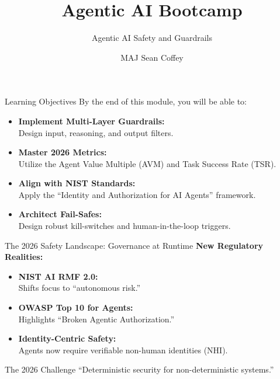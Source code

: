 \documentclass{beamer}       %
\title[]{Agentic AI Bootcamp}
\subtitle[] %
{Agentic AI Safety and Guardrails}
\author[] %
{MAJ Sean Coffey} %
\institute
{Army Cyber Institute, U.S. Military Academy}
\date{\monthyeardate}
\begin{document}
{\DivisionLogo
\begin{frame}
    \titlepage
\end{frame}
}


\begin{frame}{Learning Objectives}
    \small
    By the end of this module, you will be able to:
    \begin{itemize}
        \item \textbf{Implement Multi-Layer Guardrails:}\\
              Design input, reasoning, and output filters.
        \item \textbf{Master 2026 Metrics:}\\
              Utilize the Agent Value Multiple (AVM) and Task Success Rate (TSR).
        \item \textbf{Align with NIST Standards:}\\
              Apply the ``Identity and Authorization for AI Agents'' framework.
        \item \textbf{Architect Fail-Safes:}\\
              Design robust kill-switches and human-in-the-loop triggers.
    \end{itemize}
\end{frame}

\begin{frame}{The 2026 Safety Landscape: Governance at Runtime}
    \small
    \textbf{New Regulatory Realities:}
    \begin{itemize}
        \item \textbf{NIST AI RMF 2.0:}\\
              Shifts focus to ``autonomous risk.''
        \item \textbf{OWASP Top 10 for Agents:}\\
              Highlights ``Broken Agentic Authorization.''
        \item \textbf{Identity-Centric Safety:}\\
              Agents now require verifiable non-human identities (NHI).
    \end{itemize}
    \vfill
    \begin{alertblock}{The 2026 Challenge}
        \centering
        ``Deterministic security for non-deterministic systems.''
    \end{alertblock}
\end{frame}
\end{document}
